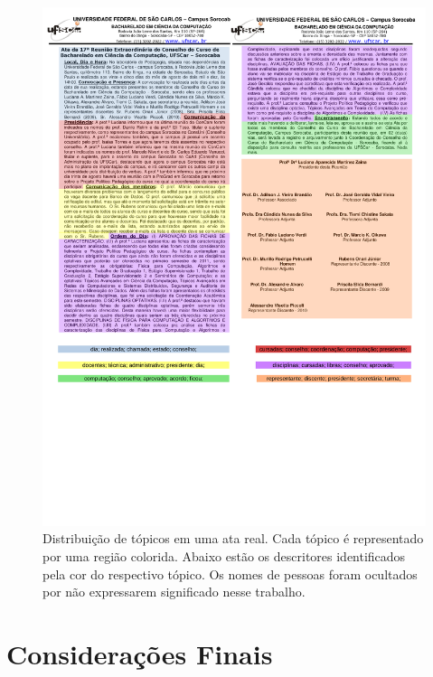   \begin{center}
	\begin{figure}[h!]

		\includegraphics[trim={ 0 235 0 0 },clip,page=1,width=\textwidth]{conteudo/capitulos/figs/doc-em-png/distribuicao.pdf}

		\caption{Distribuição de tópicos em uma ata real. Cada tópico é representado por uma região colorida. Abaixo estão os descritores identificados pela cor do respectivo tópico. Os nomes de pessoas foram ocultados por não expressarem significado nesse trabalho.}
		\label{fig:distribuicao-ata}
	\end{figure}
\end{center}




\section{Considerações Finais}


